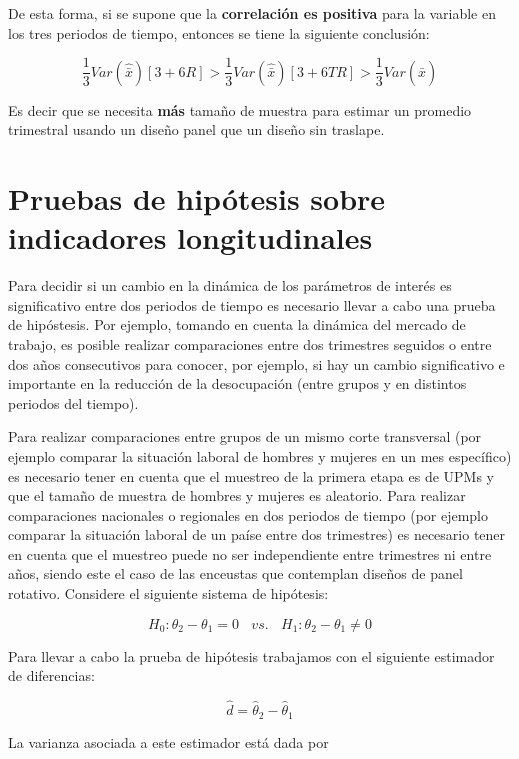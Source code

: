 De esta forma, si se supone que la \textbf{correlación es positiva} para la variable en los tres periodos de tiempo, entonces se tiene la siguiente conclusión:

\[
\frac{1}{3} Var(\hat{\bar{x}}) [3+6R] > \frac{1}{3} Var(\hat{\bar{x}}) [3+6TR] > \frac{1}{3} Var(\hat{\bar{x}})
\]

Es decir que se necesita \textbf{más} tamaño de muestra para estimar un promedio trimestral usando un diseño panel que un diseño sin traslape.

\hypertarget{pruebas-de-hipotesis-sobre-indicadores-longitudinales}{%
\section{Pruebas de hipótesis sobre indicadores longitudinales}\label{pruebas-de-hipotesis-sobre-indicadores-longitudinales}}

Para decidir si un cambio en la dinámica de los parámetros de interés es significativo entre dos periodos de tiempo es necesario llevar a cabo una prueba de hipóstesis. Por ejemplo, tomando en cuenta la dinámica del mercado de trabajo, es posible realizar comparaciones entre dos trimestres seguidos o entre dos años consecutivos para conocer, por ejemplo, si hay un cambio significativo e importante en la reducción de la desocupación (entre grupos y en distintos periodos del tiempo).

Para realizar comparaciones entre grupos de un mismo corte transversal (por ejemplo comparar la situación laboral de hombres y mujeres en un mes específico) es necesario tener en cuenta que el muestreo de la primera etapa es de UPMs y que el tamaño de muestra de hombres y mujeres es aleatorio. Para realizar comparaciones nacionales o regionales en dos periodos de tiempo (por ejemplo comparar la situación laboral de un paíse entre dos trimestres) es necesario tener en cuenta que el muestreo puede no ser independiente entre trimestres ni entre años, siendo este el caso de las enceustas que contemplan diseños de panel rotativo. Considere el siguiente sistema de hipótesis:

\[
H_0: \theta_2 - \theta_1 = 0 \ \ \ \ vs. \ \ \ \ H_1: \theta_2 - \theta_1 \neq 0
\]

Para llevar a cabo la prueba de hipótesis trabajamos con el siguiente estimador de diferencias:

\[
\hat{d} = \hat{\theta}_2 - \hat{\theta}_1
\]

La varianza asociada a este estimador está dada por

